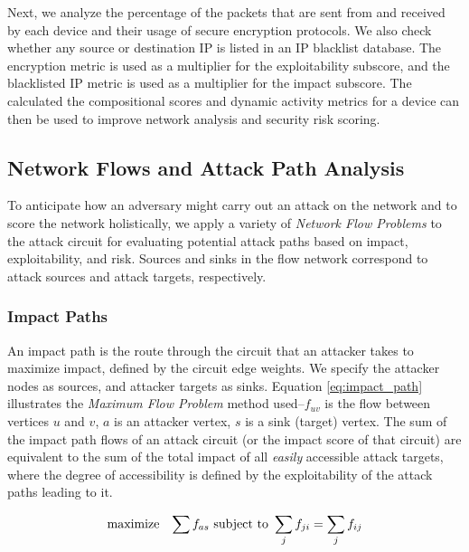Next, we analyze the percentage of the packets that are sent from and received by each device and their usage of secure encryption protocols. We also check whether any source or destination IP is listed in an IP blacklist database. The encryption metric is used as a multiplier for the exploitability subscore, and the blacklisted IP metric is used as a multiplier for the impact subscore. The calculated the compositional scores and dynamic activity metrics for a device can then be used to improve network analysis and security risk scoring.

\subsection{Network Flows and Attack Path Analysis}

To anticipate how an adversary might carry out an attack on the network and to score the network holistically, we apply a variety of \textit{Network Flow Problems} \cite{Ford-Fulkerson_algo} \cite{dantzig2003max} to the attack circuit for evaluating potential attack paths based on impact, exploitability, and risk. Sources and sinks in the flow network correspond to attack sources and attack targets, respectively.

\subsubsection{Impact Paths} 

An impact path is the route through the circuit that an attacker takes to maximize impact, defined by the circuit edge weights. We specify the attacker nodes as sources, and attacker targets as sinks. Equation \ref{eq:impact_path} illustrates the \textit{Maximum Flow Problem} method used--$f_{uv}$ is the flow between vertices $u$ and $v$, $a$ is an attacker vertex, $s$ is a sink (target) vertex. The sum of the impact path flows of an attack circuit (or the impact score of that circuit) are equivalent to the sum of the total impact of all \textit{easily} accessible attack targets, where the degree of accessibility is defined by the exploitability of the attack paths leading to it.

\begin{equation}
\begin{array}{ll@{}ll}
\text{maximize} & \displaystyle\sum\limits_{} f_{as} & \text{ subject to } \displaystyle\sum\limits_{j} f_{ji} = \displaystyle\sum\limits_{j} f_{ij}
\end{array}
\label{eq:impact_path}
\end{equation}

